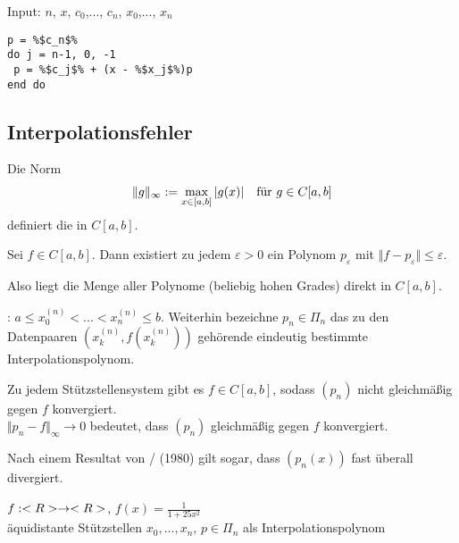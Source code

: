 \begin{algorithm}
	Input: $n$, $x$, $c_0$,..., $c_n$, $x_0$,..., $x_n$
\begin{lstlisting}
p = %$c_n$%
do j = n-1, 0, -1
 p = %$c_j$% + (x - %$x_j$%)p
end do
\end{lstlisting}
\end{algorithm}

\subsection{Interpolationsfehler}

\begin{*definition}
	Die Norm
	\begin{align}
		\Vert g\Vert_\infty := \max\limits_{x\in[a,b]}\vert g(x)\vert\quad\text{für } g\in C[a,b]\notag
	\end{align}
	definiert die  in $C[a,b]$.
\end{*definition}

\begin{proposition}
	Sei $f\in C[a,b]$. Dann existiert zu jedem $\varepsilon>0$ ein Polynom $p_\varepsilon$ mit $\Vert f-p_\varepsilon\Vert\le\varepsilon$.
\end{proposition}

Also liegt die Menge aller Polynome (beliebig hohen Grades) direkt in $C[a,b]$.

\begin{definition}[Stützstellensystem]
	: $a\le x_0^{(n)} < ... < x_n^{(n)} \le b$. Weiterhin bezeichne $p_n\in\Pi_n$ das zu den Datenpaaren $(x_k^{(n)},f(x_k^{(n)}))$ gehörende eindeutig bestimmte Interpolationspolynom.
\end{definition}

\begin{proposition}
	Zu jedem Stützstellensystem gibt es $f\in C[a,b]$, sodass $(p_n)$ nicht gleichmäßig gegen $f$ konvergiert. \\
	$\Vert p_n-f\Vert_\infty\to 0$ bedeutet, dass $(p_n)$ gleichmäßig gegen $f$ konvergiert.
\end{proposition}

Nach einem Resultat von / (1980) gilt sogar, dass $(p_n(x))$ fast überall divergiert.

\begin{example}
	$f:<R>\to<R>$, $f(x)=\frac{1}{1+25x^2}$ \\
	äquidistante Stützstellen $x_0,...,x_n$, $p\in\Pi_n$ als Interpolationspolynom
	\begin{center}\end{center}
\end{example}